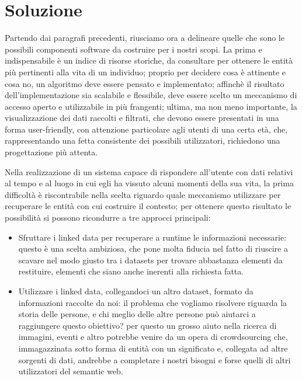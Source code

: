 \documentclass[sigproc-sp.tex]{subfiles}
\begin{document}
\section{Soluzione}
Partendo dai paragrafi precedenti, riusciamo ora a delineare quelle che sono le possibili componenti software da costruire per i nostri scopi. La prima e indispensabile è un indice di risorse storiche, da consultare per ottenere le entità più pertinenti alla vita di un individuo; proprio per decidere cosa è attinente e cosa no, un algoritmo deve essere pensato e implementato; affinchè il risultato dell’implementazione sia scalabile e flessibile, deve essere scelto un meccanismo di accesso aperto e utilizzabile in più frangenti; ultima, ma non meno importante, la visualizzazione dei dati raccolti e filtrati, che devono essere presentati in una forma user-friendly, con attenzione particolare agli utenti di una certa età, che, rappresentando una fetta consistente dei possibili utilizzatori, richiedono una progettazione più attenta.

Nella realizzazione di un sistema capace di rispondere all’utente con dati relativi al tempo e al luogo in cui egli ha vissuto alcuni momenti della sua vita, la prima difficoltà è riscontrabile nella scelta riguardo quale meccanismo utilizzare per recuperare le entità con cui costruire il contesto; per ottenere questo risultato le possibilità si possono ricondurre a tre approcci principali:

\begin{itemize}
\item Sfruttare i linked data per recuperare a runtime le informazioni necessarie: questo è una scelta ambiziosa, che pone molta fiducia nel fatto di riuscire a scavare nel modo giusto tra i datasets per trovare abbastanza elementi da restituire, elementi che siano anche inerenti alla richiesta fatta.
\item Utilizzare i linked data, collegandoci un altro dataset, formato da informazioni raccolte da noi: il problema che vogliamo risolvere riguarda la storia delle persone, e chi meglio delle altre persone può aiutarci a raggiungere questo obiettivo? per questo un grosso aiuto nella ricerca di immagini, eventi e altro potrebbe venire da un opera di crowdsourcing che, immagazzinata sotto forma di entità con un significato e, collegata ad altre sorgenti di dati, andrebbe a completare i nostri bisogni e forse quelli di altri utilizzatori del semantic web.
\end{itemize}
\end{document}
